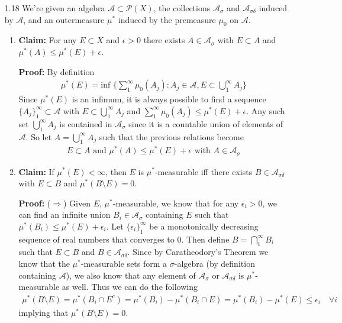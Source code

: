\documentclass[11pt,letter]{article}
\begin{document}
\begin{enumerate}
    \item[1.18] We're given an algebra $\mathcal{A} \subset \mathcal{P}(X)$, the collections $\mathcal{A}_\sigma$ and $\mathcal{A}_{\sigma\delta}$ induced by $\mathcal{A}$, and an outermeasure $\mu^*$ induced by the premeasure $\mu_0$ on $\mathcal{A}$.
    \begin{enumerate}
        \item \textbf{Claim:} For any $E \subset X$ and $\epsilon > 0$ there exists $A \in \mathcal{A}_\sigma$ with $E \subset A$ and $\mu^*(A) \le \mu^*(E) + \epsilon$.

        \textbf{Proof:} By definition
        \begin{align*}
            \mu^*(E) = \text{inf } \Big\{\sum\limits_1^\infty \mu_0(A_j): A_j \in \mathcal{A}, E \subset \bigcup\limits_1^\infty A_j \Big\}
        \end{align*}
        Since $\mu^*(E)$ is an infimum, it is always possible to find a sequence $\{A_j\}_1^\infty \subset \mathcal{A}$ with $E \subset \bigcup_1^\infty A_j$ and $\sum_1^\infty \mu_0(A_j) \le \mu^*(E) + \epsilon$. Any such set $\bigcup_1^\infty A_j$ is contained in $\mathcal{A}_\sigma$ since it is a countable union of elements of $\mathcal{A}$. So let $A = \bigcup_1^\infty A_j$ such that the previous relations become
        \begin{align*}
            E \subset A \text{ and } \mu^*(A) \le \mu^*(E) + \epsilon \text{ with } A \in \mathcal{A}_\sigma
        \end{align*}
        
        \item \textbf{Claim:} If $\mu^*(E) < \infty$, then $E$ is $\mu^*$-measurable iff there exists $B \in \mathcal{A}_{\sigma\delta}$ with $E \subset B$ and $\mu^*(B \setminus E) = 0$.

        \textbf{Proof:} ($\Rightarrow$) Given $E$, $\mu^*$-measurable, we know that for any $\epsilon_i > 0$, we can find an infinite union $B_i \in \mathcal{A}_\sigma$ containing $E$ such that $\mu^*(B_i) \le \mu^*(E) + \epsilon_i$. Let $\{\epsilon_i\}_1^\infty$ be a monotonically decreasing sequence of real numbers that converges to 0. Then define $B = \bigcap_1^\infty B_i$ such that $E \subset B$ and $B \in \mathcal{A}_{\sigma\delta}$. Since by Caratheodory's Theorem we know that the $\mu^*$-measurable sets form a $\sigma$-algebra (by definition containing $\mathcal{A}$), we also know that any element of $\mathcal{A}_\sigma$ or $\mathcal{A}_{\sigma\delta}$ is $\mu^*$-measurable as well. Thus we can do the following
        \begin{align*}
            \mu^*(B \setminus E) = \mu^*(B_i \cap E^c) = \mu^*(B_i) - \mu^*(B_i \cap E) = \mu^*(B_i) - \mu^*(E) \le \epsilon_i \quad \forall i
        \end{align*}
        implying that $\mu^*(B \setminus E) = 0$.
        

\end{enumerate}
\end{enumerate}
\end{document}
